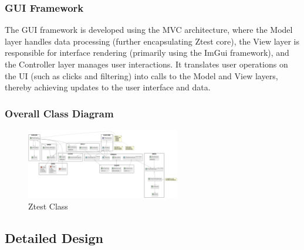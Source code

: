 \documentclass{article}
\begin{document}
\subsubsection{GUI Framework}
The GUI framework is developed using the MVC architecture, where the Model layer handles data processing (further encapsulating Ztest core), the View layer is responsible for interface rendering (primarily using the ImGui framework), and the Controller layer manages user interactions. It translates user operations on the UI (such as clicks and filtering) into calls to the Model and View layers, thereby achieving updates to the user interface and data.
\subsubsection{Overall Class Diagram}
\begin{figure}[H]
    \centering
    \includegraphics[angle=270,width=0.6\textwidth]{img/class.png} %
    \caption{ Ztest Class}
    \label{fig:ztest class }
\end{figure}
\subsection{Detailed Design}
\end{document}
